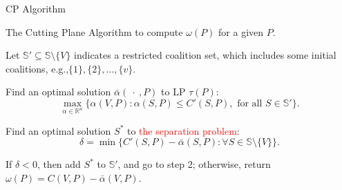 \documentclass[14pt]{beamer}
\begin{document}
\begin{frame}{CP Algorithm}
	\begin{block}
		{The Cutting Plane Algorithm to compute $\omega(P)$ for a given $P$.}
	\end{block}
	\begin{description}
	  \justifying
		\footnotesize
	  \item[Step 1.] Let $\mathbb{S}'\subseteq \mathbb{S}\setminus \{V\}$ indicates a restricted coalition set, which includes some initial coalitions,
	  \vspace{10pt}
	  e.g.,$ \{1\},\{2\},\ldots,\{v\}$.
	  \item[Step 2.] Find an optimal solution $\bar{\alpha}(\ \cdot \ ,P)$ to LP $\tau(P)$:
	  \begin{equation*}
	  \max_{\alpha\in \mathbb{R}^n} \big\{ \alpha(V,P): \alpha(S,P) \leq C'(S,P), \mbox{ for all } S \in \mathbb{S}'\big\}.
	  \end{equation*}
	  \vspace{-11pt}
	  \item[Step 3.]
	  Find an optimal solution $S^*$ to \textcolor{red}{the separation problem}:
	  \begin{equation*}
	  \delta = \min \big\{ C'(S,P) -\bar{\alpha}(S,P): \forall S \in \mathbb{S} \setminus \{V\}\big\}.
	  \end{equation*}
	  \item[Step 4.]
	  If $\delta<0$, then add $S^*$ to $\mathbb{S}'$, and go to step 2; otherwise, return $\omega(P)=C(V,P)-\bar{\alpha}(V,P)$.
	\end{description}
\end{frame}
\end{document}
